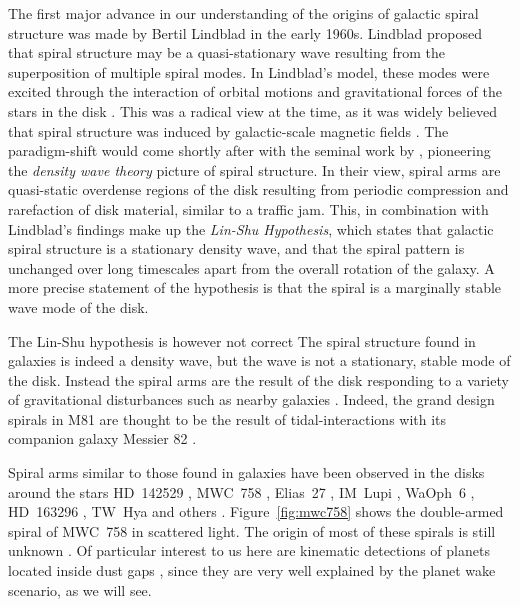 The first major advance in our understanding of the origins of galactic spiral structure was made by Bertil Lindblad in the early 1960s. 
Lindblad proposed that spiral structure may be a quasi-stationary wave resulting from the superposition of multiple spiral modes.
In Lindblad's model, these modes were excited through the interaction of orbital motions and gravitational forces of the stars in the disk \citep{lindblad1963}.
This was a radical view at the time, as it was widely believed that spiral structure was induced by galactic-scale magnetic fields \citep[e.g.][]{hoyle1961,oki1964}.
The paradigm-shift would come shortly after with the seminal work by \citet{lin1964}, pioneering the \textit{density wave theory} picture of spiral structure.
In their view, spiral arms are quasi-static overdense regions of the disk resulting from periodic compression and rarefaction of disk material, similar to a traffic jam.
This, in combination with Lindblad's findings make up the \textit{Lin-Shu Hypothesis}, which states that galactic spiral structure is a stationary density wave, and that the spiral pattern is unchanged over long timescales apart from the overall rotation of the galaxy.
A more precise statement of the hypothesis is that the spiral is a marginally stable wave mode of the disk.

The Lin-Shu hypothesis is however not correct \citep{toomre1969,dobbs2014}
The spiral structure found in galaxies is indeed a density wave, but the wave is not a stationary, stable mode of the disk.
Instead the spiral arms are the result of the disk responding to a variety of gravitational disturbances such as nearby galaxies \citep{goldreich1965,julian1966}.
Indeed, the grand design spirals in M81 are thought to be the result of tidal-interactions with its companion galaxy Messier 82 \citep{yun1999a}.

Spiral arms similar to those found in galaxies have been observed in the disks around the stars HD~142529 \citep{christiaens2014}, MWC~758 \citep{benisty2015}, Elias~27 \citep{perez2016,huang2018}, IM~Lupi \citep{avenhaus2018,huang2018}, WaOph~6 \citep{huang2018}, HD~163296 \citep{calcino2022}, TW~Hya \citep{teague2022} and others \citep[and references therin]{dong2018}.
Figure~\ref{fig:mwc758} shows the double-armed spiral of MWC~758 in scattered light.
The origin of most of these spirals is still unknown \citep[e.g.][]{zhang2018}.
Of particular interest to us here are kinematic detections of planets located inside dust gaps \citep{pinte2018a,pinte2019,pinte2020,teague2021,teague2022}, since they are very well explained by the planet wake scenario, as we will see.

